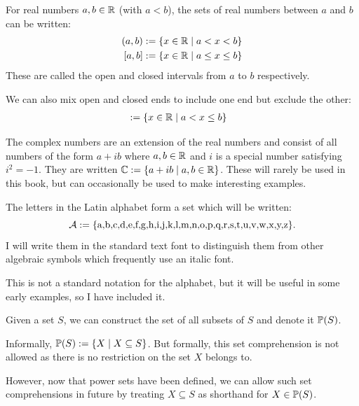 \begin{example}[Intervals]
    For real numbers $a,b \in \mathbb{R}$ (with $a < b$), the sets of real numbers between $a$ and $b$ can be written:
    \begin{align*}
        (a,b) &:= \{ x \in \mathbb{R} \mid a < x < b \} \\
        [a,b] &:= \{ x \in \mathbb{R} \mid a \le x \le b \}
    \end{align*}
    These are called the open and closed intervals from $a$ to $b$ respectively.

    \medskip\noindent
    We can also mix open and closed ends to include one end but exclude the other:
    \begin{align*}
        [a,b) &:= \{ x \in \R \mid a \le x < b \} \\
        (a,b] &:= \{ x \in \R \mid a < x \le b \}
    \end{align*}

\end{example}
\begin{example}
    The complex numbers are an extension of the real numbers and consist of all numbers of the form $a + ib$ where $a, b \in \mathbb{R}$ and $i$ is a special number satisfying $i^2 = -1$.
    They are written $\mathbb{C} := \{ a + ib \mid a,b \in \mathbb{R} \}$. These will rarely be used in this book, but can occasionally be used to make interesting examples.
\end{example}
\begin{example}\label{alphabet}
    The letters in the Latin alphabet form a set which will be written:
    \begin{equation*}
        \mathcal{A} := \{\text{a,b,c,d,e,f,g,h,i,j,k,l,m,n,o,p,q,r,s,t,u,v,w,x,y,z}\}.
    \end{equation*}
    I will write them in the standard text font to distinguish them from other algebraic symbols which frequently use an italic font.
\end{example}
\begin{remark}
    This is not a standard notation for the alphabet, but it will be useful in some early examples, so I have included it.
\end{remark}
\begin{example}
    Given a set $S$, we can construct the set of all subsets of $S$ and denote it $\mathbb{P}(S)$.
\end{example}
\begin{remark}
    Informally, $\mathbb{P}(S) := \{ X \mid X \subseteq S \}$.
    But formally, this set comprehension is not allowed as there is no restriction on the set $X$ belongs to.

    \medskip\noindent
    However, now that power sets have been defined, we can allow such set comprehensions in future by treating $X \subseteq S$ as shorthand for $X \in \mathbb{P}(S)$.
\end{remark}

